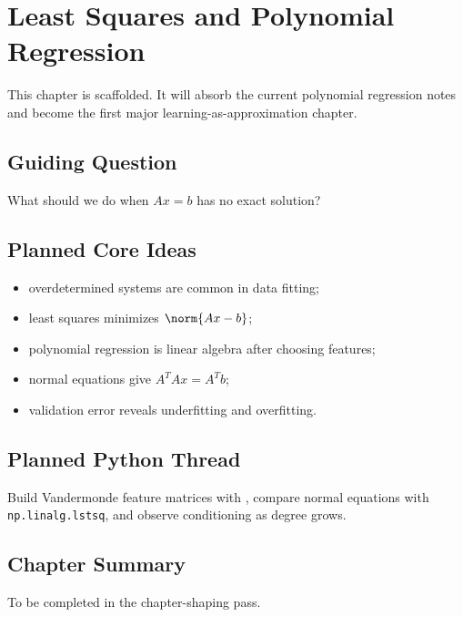 \chapter{Least Squares and Polynomial Regression}
\label{ch:least-squares-regression}

\begin{draftbox}
This chapter is scaffolded. It will absorb the current polynomial regression
notes and become the first major learning-as-approximation chapter.
\end{draftbox}

\section{Guiding Question}

What should we do when $Ax=b$ has no exact solution?

\section{Planned Core Ideas}

\begin{itemize}
  \item overdetermined systems are common in data fitting;
  \item least squares minimizes $\norm{Ax-b}$;
  \item polynomial regression is linear algebra after choosing features;
  \item normal equations give $A^TAx=A^Tb$;
  \item validation error reveals underfitting and overfitting.
\end{itemize}

\section{Planned Python Thread}

Build Vandermonde feature matrices with \NumPy, compare normal equations with
\texttt{np.linalg.lstsq}, and observe conditioning as degree grows.

\section*{Chapter Summary}

To be completed in the chapter-shaping pass.


